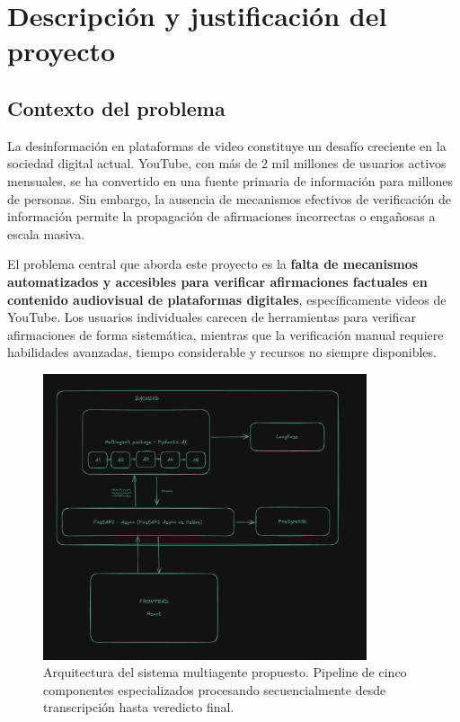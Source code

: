 \documentclass[12pt,a4paper]{article}
\begin{document}
\section{Descripción y justificación del proyecto}

\subsection{Contexto del problema}

La desinformación en plataformas de video constituye un desafío creciente en la sociedad digital actual. YouTube, con más de 2 mil millones de usuarios activos mensuales, se ha convertido en una fuente primaria de información para millones de personas. Sin embargo, la ausencia de mecanismos efectivos de verificación de información permite la propagación de afirmaciones incorrectas o engañosas a escala masiva.

El problema central que aborda este proyecto es la \textbf{falta de mecanismos automatizados y accesibles para verificar afirmaciones factuales en contenido audiovisual de plataformas digitales}, específicamente videos de YouTube. Los usuarios individuales carecen de herramientas para verificar afirmaciones de forma sistemática, mientras que la verificación manual requiere habilidades avanzadas, tiempo considerable y recursos no siempre disponibles.

\begin{figure}[h]
\centering
\includegraphics[width=0.85\textwidth]{./figs/system_architecture.png}
\caption{Arquitectura del sistema multiagente propuesto. Pipeline de cinco componentes especializados procesando secuencialmente desde transcripción hasta veredicto final.}
\label{fig:arquitectura}
\end{figure}
\end{document}

